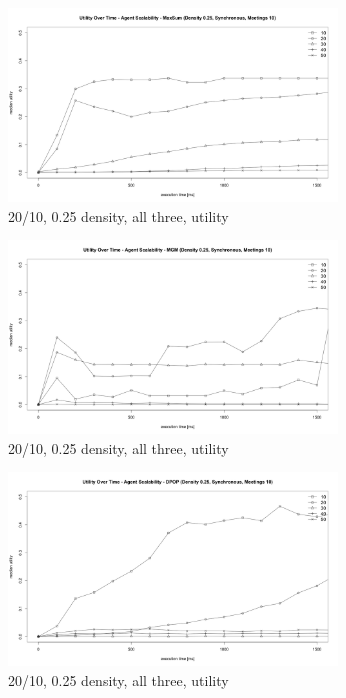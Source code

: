 \begin{figure}[H]
\centering
\includegraphics[width=330px]{graphics/experiments/static/st_8}
\caption{20/10, 0.25 density, all three, utility}
\label{fig:st_8}
\end{figure}
\begin{figure}[H]
\centering
\includegraphics[width=330px]{graphics/experiments/static/st_9}
\caption{20/10, 0.25 density, all three, utility}
\label{fig:st_9}
\end{figure}
\begin{figure}[H]
\centering
\includegraphics[width=330px]{graphics/experiments/static/st_10}
\caption{20/10, 0.25 density, all three, utility}
\label{fig:st_10}
\end{figure}

